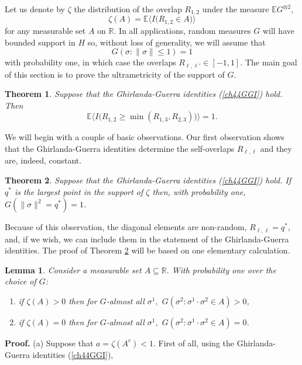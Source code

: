 \documentclass[12pt]{article}
\newcommand{\e}{\mathbb{E}}
\newcommand{\Reals}{\mathbb{R}}
\newcommand{\la}{\langle}
\newcommand{\ra}{\rangle}
\newtheorem{lemma}{Lemma}
\newtheorem{theorem}{Theorem}
\theoremstyle{nonumberplain}
\begin{document}
Let us denote by $\zeta$ the distribution of the overlap $R_{1,2}$ under the measure $\e G^{\otimes 2}$, 
\begin{equation}
\zeta(A) =\e \bigl\la I\bigl(R_{1,2} \in A\bigr) \bigr\ra
\label{ch44fop}
\end{equation}
for any measurable set $A$ on $\Reals.$ In all applications, random measures $G$ will have bounded support in $H$ so, without loss of generality, we will assume that 
\begin{equation}
G(\sigma : \|\sigma\| \leq 1) = 1
\end{equation}
with probability one, in which case the overlaps $R_{\ell,\ell'}\in [-1,1]$. The main goal of this section is to prove the ultrametricity of the support of $G$.
\begin{theorem}\label{ch44ThUltra}
Suppose that the Ghirlanda-Guerra identities (\ref{ch44GGI}) hold. Then
\begin{equation}
\e \bigl\la I\bigl(R_{1,2}\geq \min(R_{1,3},R_{2,3})\bigr) \bigr\ra=1.
\label{ch44ultra}
\end{equation}
\end{theorem}
We will begin with a couple of basic observations. Our first observation shows that the Ghirlanda-Guerra identities determine the self-overlaps $R_{\ell,\ell}$ and they are, indeed, constant.
 \begin{theorem}\label{ch44ThSphere}
 Suppose that the Ghirlanda-Guerra identities (\ref{ch44GGI}) hold. If $q^*$ is the largest point in the support of $\zeta$ then, with probability one, $G(\|\sigma\|^2 = q^*)=1$. 
\end{theorem} \noindent
Because of this observation, the diagonal elements are non-random, $R_{\ell,\ell} = q^*$, and, if we wish, we can include them in the statement of the Ghirlanda-Guerra identities. The proof of Theorem \ref{ch44ThSphere} will be based on one elementary calculation.
\begin{lemma}\label{LemDS2}
Consider a measurable set $A\subseteq \Reals.$ With probability one over the choice of $G$:
\begin{enumerate}
\item[(a)] if $\zeta(A)>0$ then for $G$-almost all $\sigma^1,$ $G(\sigma^2: \sigma^1\cdot \sigma^2 \in A)>0$,
\item[(b)] if $\zeta(A) = 0$ then for $G$-almost all $\sigma^1,$ $G(\sigma^2: \sigma^1\cdot \sigma^2 \in A)=0$.
\end{enumerate}
\end{lemma}
\noindent\textbf{Proof.} (a) Suppose that $a=\zeta(A^c)<1.$ First of all, using the Ghirlanda-Guerra identities (\ref{ch44GGI}), 
\end{document}
